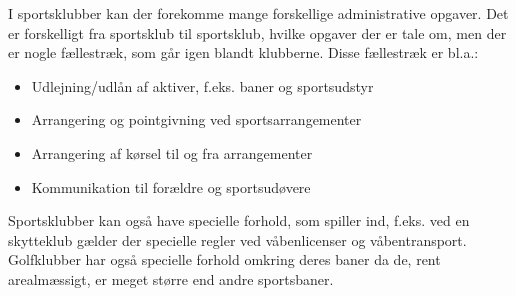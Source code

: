 I sportsklubber kan der forekomme mange forskellige administrative opgaver. Det er forskelligt fra sportsklub til sportsklub, hvilke opgaver der er tale om, men der er nogle fællestræk, som går igen blandt klubberne. Disse fællestræk er bl.a.:
\begin{itemize}
	\item Udlejning/udlån af aktiver, f.eks. baner og sportsudstyr 
	\item Arrangering og pointgivning ved sportsarrangementer
	\item Arrangering af kørsel til og fra arrangementer
	\item Kommunikation til forældre og sportsudøvere
\end{itemize}

Sportsklubber kan også have specielle forhold, som spiller ind, f.eks. ved en skytteklub gælder der specielle regler ved våbenlicenser og våbentransport. Golfklubber har også specielle forhold omkring deres baner da de, rent arealmæssigt, er meget større end andre sportsbaner. 









